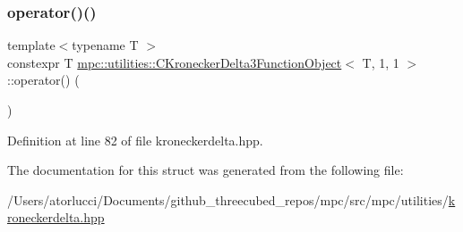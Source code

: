 \subsubsection{\texorpdfstring{operator()()}{operator()()}}
{\footnotesize\ttfamily template$<$typename T $>$ \\
constexpr T \mbox{\hyperlink{structmpc_1_1utilities_1_1_c_kronecker_delta3_function_object}{mpc\+::utilities\+::\+C\+Kronecker\+Delta3\+Function\+Object}}$<$ T, 1, 1 $>$\+::operator() (\begin{DoxyParamCaption}{ }\end{DoxyParamCaption})\hspace{0.3cm}{\ttfamily [inline]}}



Definition at line 82 of file kroneckerdelta.\+hpp.



The documentation for this struct was generated from the following file\+:\begin{DoxyCompactItemize}
\item 
/\+Users/atorlucci/\+Documents/github\+\_\+threecubed\+\_\+repos/mpc/src/mpc/utilities/\mbox{\hyperlink{kroneckerdelta_8hpp}{kroneckerdelta.\+hpp}}\end{DoxyCompactItemize}
